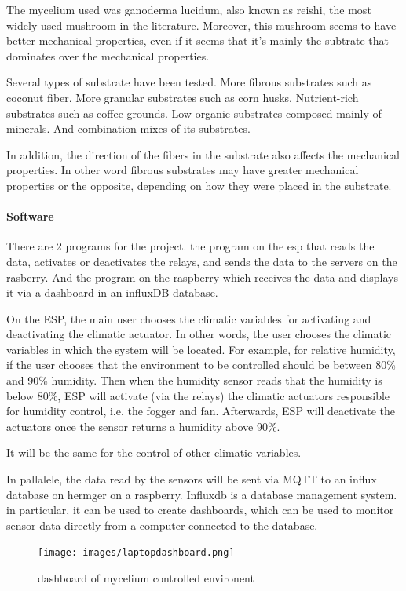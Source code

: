 The mycelium used was ganoderma lucidum, also known as reishi, the most widely used mushroom in the literature.\cite{yang2021material}
Moreover, this mushroom seems to have better mechanical properties, even if it seems that it's mainly the subtrate that dominates over the mechanical properties. 

Several types of substrate have been tested. More fibrous substrates such as coconut fiber. More granular substrates such as corn husks. Nutrient-rich substrates such as coffee grounds. Low-organic substrates composed mainly of minerals. 
And combination mixes of its substrates.

In addition, the direction of the fibers in the substrate also affects the mechanical properties. In other word fibrous substrates may have greater mechanical properties or the opposite, depending on how they were placed in the substrate.

\paragraph{Software}
There are 2 programs for the project. the program on the esp that reads the data, activates or deactivates the relays, and sends the data to the servers on the rasberry. 
And the program on the raspberry which receives the data and displays it via a dashboard in an influxDB database. 

On the ESP, the main user chooses the climatic variables for activating and deactivating the climatic actuator. In other words, the user chooses the climatic variables in which the system will be located. For example, for relative humidity, if the user chooses that the environment to be controlled should be between 80\% and 90\% humidity. Then when the humidity sensor reads that the humidity is below 80\%, ESP will activate (via the relays) the climatic actuators responsible for humidity control, i.e. the fogger and fan. Afterwards, ESP will deactivate the actuators once the sensor returns a humidity above 90\%.

It will be the same for the control of other climatic variables. 

In pallalele, the data read by the sensors will be sent via MQTT to an influx database on hermger on a raspberry. 
Influxdb is a database management system. in particular, it can be used to create dashboards, which can be used to monitor sensor data directly from a computer connected to the database. 

\begin{figure}[h]
    \centering
    \texttt{[image: images/laptopdashboard.png]}
    \caption{dashboard of mycelium controlled environent}
    \label{fig:Mycemachinne}
\end{figure} 

